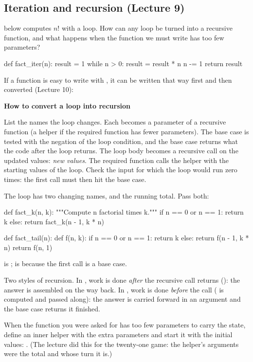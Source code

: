 \documentclass[10pt]{scrartcl}
\newenvironment{howto}[1]{\begin{mdframed}[style=howtostyle]{\color{NavyBlue}\textbf{#1}}\par\vspace{2pt}}{\end{mdframed}}
\begin{document}
\subsection{Iteration and recursion (Lecture 9)}
\begin{qbox}
   below computes $n!$ with a loop. How can any  loop be turned into a recursive function, and what happens when the function we must write has too few parameters?
\end{qbox}
\begin{py}
def fact_iter(n):
    result = 1
    while n > 0:
        result = result * n
        n -= 1
    return result
\end{py}
If a function is easy to write with , it can be written that way first and then converted (Lecture 10):
\begin{howto}{How to convert a  loop into recursion}
\begin{steps}
  \ii List the names the loop changes. Each becomes a parameter of a recursive function (a helper if the required function has fewer parameters).
  \ii The base case is tested with the negation of the loop condition, and the base case returns what the code after the loop returns.
  \ii The loop body becomes a recursive call on the updated values: \emph{new values}\cd{)}.
  \ii The required function calls the helper with the starting values of the loop.
  \ii Check the input for which the loop would run zero times: the first call must then hit the base case.
\end{steps}
\end{howto}
\begin{example*}
The loop has two changing names,  and the running total. Pass both:
\begin{py}
def fact_k(n, k):
    """Compute n factorial times k."""
    if n == 0 or n == 1:
        return k
    else:
        return fact_k(n - 1, k * n)

def fact_tail(n):
    def f(n, k):
        if n == 0 or n == 1:
            return k
        else:
            return f(n - 1, k * n)
    return f(n, 1)
\end{py}
 is ;  is  because the first call  is a base case.
\end{example*}
\begin{ideabox}
Two styles of recursion. In , work is done \emph{after} the recursive call returns (): the answer is assembled on the way back. In , work is done \emph{before} the call ( is computed and passed along): the answer is carried forward in an argument and the base case returns it finished.

When the function you were asked for has too few parameters to carry the state, define an inner helper with the extra parameters and start it with the initial values: . (The lecture did this for the twenty-one game: the helper's arguments were the total and whose turn it is.)
\end{ideabox}
\end{document}
